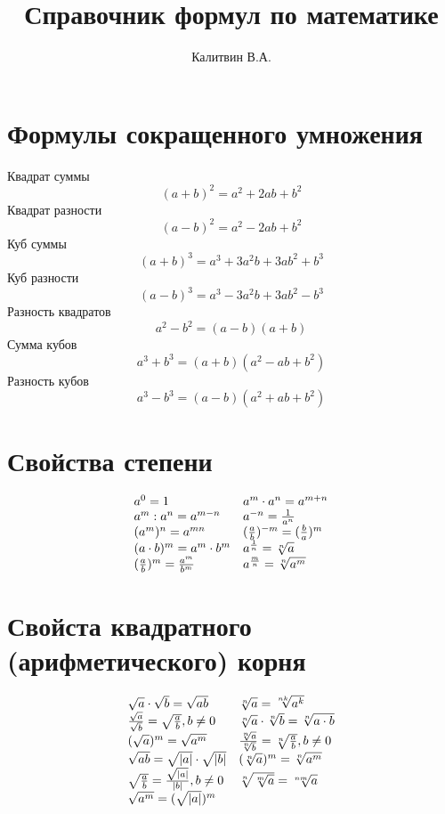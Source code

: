 \documentclass[a4paper, 12pt]{article}
\begin{document}
\author{Калитвин В.А.}
\title{Справочник формул по математике}
\maketitle
\thispagestyle{empty}
\newpage
\section{Формулы сокращенного умножения}

Квадрат суммы
$$ (a+b)^2=a^2+2ab+b^2$$
Квадрат разности
$$(a-b)^2=a^2-2ab+b^2$$
Куб суммы
$$(a+b)^3=a^3+3a^2b+3ab^2+b^3$$
Куб разности
$$(a-b)^3=a^3-3a^2b+3ab^2-b^3$$
Разность квадратов
$$a^2-b^2=(a-b)(a+b)$$
Сумма кубов
$$a^3+b^3=(a+b)(a^2-ab+b^2)$$
Разность кубов
$$a^3-b^3=(a-b)(a^2+ab+b^2)$$

\section{Свойства степени}

$$
\begin{array}{ll}
a^0=1  & a^m\cdot a^n=a^{m+n}\\
a^m: a^n=a^{m-n} & a^{-n}=\frac{1}{a^n}\\
(a^m)^n=a^{mn} & (\frac{a}{b})^{-m}=(\frac{b}{a})^{m}\\
(a\cdot b)^m=a^m\cdot b^m & a^{\frac{1}{n}}=\root{n}\of{a}\\
(\frac{a}{b})^m =\frac{a^m}{b^m} & a^{\frac{m}{n}}=\root{n}\of{a^m}\\
\end{array}
$$

\section{Свойста квадратного (арифметического) корня}

$$
\begin{array}{ll}
\sqrt{a}\cdot \sqrt{b} = \sqrt{ab}  & \root{n}\of{a}=\root{nk}\of{a^k} \\
\frac{\sqrt{a}}{\sqrt{b}}=\sqrt{\frac{a}{b}}, b\not= 0 & \root{n}\of{a}\cdot \root{n}\of{b}=\root{n}\of{a\cdot b}\\
(\sqrt{a})^m=\sqrt{a^m} & \frac{\root{n}\of{a}}{\root{n}\of{b}}=\root{n}\of{\frac{a}{b}}, b\not=0\\
\sqrt{ab}=\sqrt{|a|}\cdot \sqrt{|b|} & (\root{n}\of{a})^m = \root{n}\of{a^m}\\
\sqrt{\frac{a}{b}}=\frac{\sqrt{|a|}}{|b|}, b\not=0 & \root{n}\of{\root{m}\of{a}} = \root{nm}\of{a}\\
\sqrt{a^m}=(\sqrt{|a|})^m
\end{array}
$$
\end{document}
